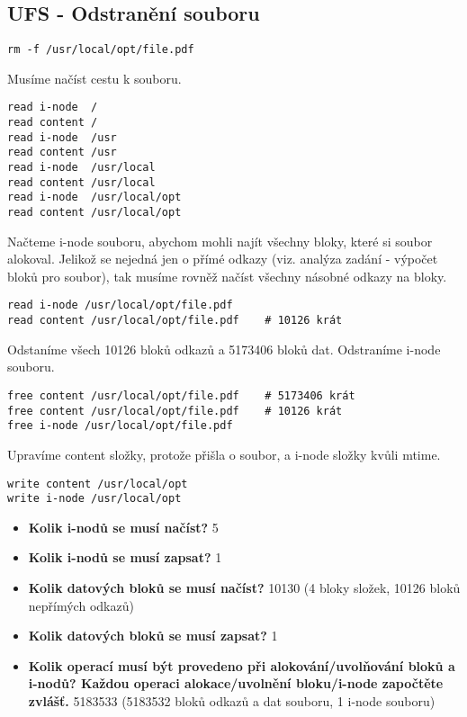 \subsection{UFS - Odstranění souboru}

\begin{verbatim}
rm -f /usr/local/opt/file.pdf
\end{verbatim}

Musíme načíst cestu k souboru.

\begin{verbatim}
read i-node  /
read content /
read i-node  /usr
read content /usr
read i-node  /usr/local
read content /usr/local
read i-node  /usr/local/opt
read content /usr/local/opt
\end{verbatim}

Načteme i-node souboru, abychom mohli najít všechny bloky, které si soubor alokoval. Jelikož se nejedná jen o přímé odkazy (viz. analýza zadání - výpočet bloků pro soubor), tak musíme rovněž načíst všechny násobné odkazy na bloky.
\begin{verbatim}
read i-node /usr/local/opt/file.pdf
read content /usr/local/opt/file.pdf    # 10126 krát
\end{verbatim}

Odstaníme všech 10126 bloků odkazů a 5173406 bloků dat. Odstraníme i-node souboru.
\begin{verbatim}
free content /usr/local/opt/file.pdf    # 5173406 krát
free content /usr/local/opt/file.pdf    # 10126 krát
free i-node /usr/local/opt/file.pdf
\end{verbatim}

Upravíme content složky, protože přišla o soubor, a i-node složky kvůli mtime.
\begin{verbatim}
write content /usr/local/opt
write i-node /usr/local/opt
\end{verbatim}

\begin{itemize}
    \item \textbf{Kolik i-nodů se musí načíst?} 5
    \item \textbf{Kolik i-nodů se musí zapsat?} 1
    \item \textbf{Kolik datových bloků se musí načíst?} 10130
    (4 bloky složek, 10126 bloků nepřímých odkazů)
    \item \textbf{Kolik datových bloků se musí zapsat?} 1
    \item \textbf{Kolik operací musí být provedeno při alokování/uvolňování bloků a i-nodů? Každou operaci alokace/uvolnění bloku/i-node započtěte zvlášť.} 5183533
    (5183532 bloků odkazů a dat souboru, 1 i-node souboru)
\end{itemize}
